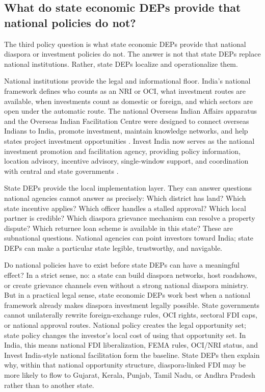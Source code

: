 \documentclass[12pt]{article}
\let\oldsubsection\subsection
\renewcommand{\subsection}{\FloatBarrier\oldsubsection}
\begin{document}
\subsection{What do state economic DEPs provide that national policies do not?}

The third policy question is what state economic DEPs provide that national diaspora or investment policies do not. The answer is not that state DEPs replace national institutions. Rather, state DEPs localize and operationalize them.

National institutions provide the legal and informational floor. India's national framework defines who counts as an NRI or OCI, what investment routes are available, when investments count as domestic or foreign, and which sectors are open under the automatic route. The national Overseas Indian Affairs apparatus and the Overseas Indian Facilitation Centre were designed to connect overseas Indians to India, promote investment, maintain knowledge networks, and help states project investment opportunities \citep{ministry_of_external_affairs_overview_nodate, high_commission_of_india_dar_es_salaam_high_nodate}. Invest India now serves as the national investment promotion and facilitation agency, providing policy information, location advisory, incentive advisory, single-window support, and coordination with central and state governments \citep{maximize_india_with_maximum_world_about_nodate}.

State DEPs provide the local implementation layer. They can answer questions national agencies cannot answer as precisely: Which district has land? Which state incentive applies? Which officer handles a stalled approval? Which local partner is credible? Which diaspora grievance mechanism can resolve a property dispute? Which returnee loan scheme is available in this state? These are subnational questions. National agencies can point investors toward India; state DEPs can make a particular state legible, trustworthy, and navigable.

Do national policies have to exist before state DEPs can have a meaningful effect? In a strict sense, no: a state can build diaspora networks, host roadshows, or create grievance channels even without a strong national diaspora ministry. But in a practical legal sense, state economic DEPs work best when a national framework already makes diaspora investment legally possible. State governments cannot unilaterally rewrite foreign-exchange rules, OCI rights, sectoral FDI caps, or national approval routes. National policy creates the legal opportunity set; state policy changes the investor's local cost of using that opportunity set. In India, this means national FDI liberalization, FEMA rules, OCI/NRI status, and Invest India-style national facilitation form the baseline. State DEPs then explain why, within that national opportunity structure, diaspora-linked FDI may be more likely to flow to Gujarat, Kerala, Punjab, Tamil Nadu, or Andhra Pradesh rather than to another state.
\end{document}
